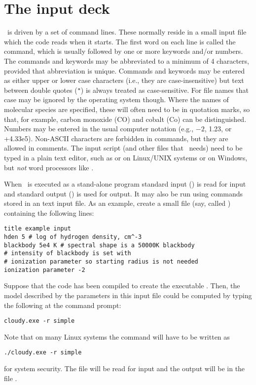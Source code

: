 \section{The input deck}

\noindent \Cloudy\ is driven by a set of command lines. These normally reside
in a small input file which the code reads when it starts. The first word on
each line is called the command, which is usually followed by one or more
keywords and/or numbers. The commands and keywords may be abbreviated to a
minimum of 4 characters, provided that abbreviation is unique. Commands and
keywords may be entered as either upper or lower case characters (i.e., they
are case-insensitive) but text between double quotes (\verb|"|) is always
treated as case-sensitive. For file names that case may be ignored by the
operating system though. Where the names of molecular species are specified,
these will often need to be in quotation marks, so that, for example, carbon
monoxide (CO) and cobalt (Co) can be distinguished. Numbers may be entered in
the usual computer notation (e.g., $-2$, 1.23, or +4.33e5). Non-ASCII
characters are forbidden in commands, but they are allowed in comments. The
input script (and other files that \Cloudy\ needs) need to be typed in a plain
text editor, such as  or  on Linux/UNIX systems or
 on Windows, but {\em not} word processors like .

When \Cloudy\ is executed as a stand-alone program standard input
() is read for input and standard output
() is used for output.  It may also be run using
commands stored in an text input file.  As an example, create a small
file (say, called ) containing the following
lines:

\begin{verbatim}
title example input
hden 5 # log of hydrogen density, cm^-3
blackbody 5e4 K # spectral shape is a 50000K blackbody
# intensity of blackbody is set with
# ionization parameter so starting radius is not needed
ionization parameter -2
\end{verbatim}
Suppose that the code has been compiled to create the executable .
Then, the model described by the parameters in this input file could be
computed by typing the following at the command prompt:
\begin{verbatim}
cloudy.exe -r simple
\end{verbatim}
Note that on many Linux systems the command will have to be written as
\begin{verbatim}
./cloudy.exe -r simple
\end{verbatim}
for system security.  
The file  will be read for input and the output will be in the file
.  

